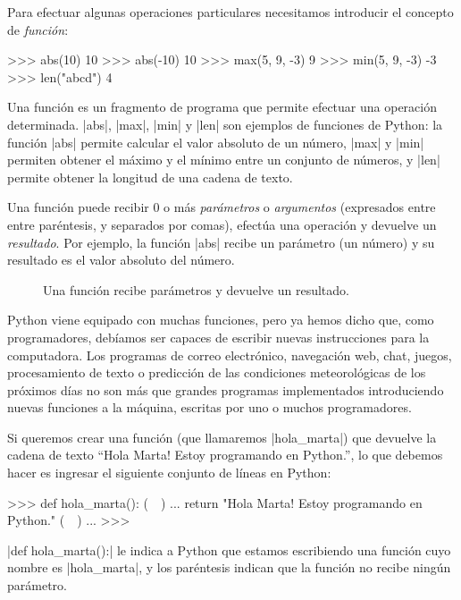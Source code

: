 Para efectuar algunas operaciones particulares necesitamos introducir el
concepto de \emph{función}:

\begin{codigo-python-sn}
>>> abs(10)
10
>>> abs(-10)
10
>>> max(5, 9, -3)
9
>>> min(5, 9, -3)
-3
>>> len("abcd")
4
\end{codigo-python-sn}

Una función es un fragmento de programa que permite efectuar una operación
determinada.  |abs|, |max|, |min| y |len| son ejemplos de funciones de Python:
la función |abs| permite calcular el valor absoluto de un número, |max| y |min|
permiten obtener el máximo y el mínimo entre un conjunto de números, y |len|
permite obtener la longitud de una cadena de texto.

Una función puede recibir 0 o más \emph{parámetros} o \emph{argumentos}
(expresados entre entre paréntesis, y separados por comas), efectúa una
operación y devuelve un \emph{resultado}.  Por ejemplo, la función |abs| recibe
un parámetro (un número) y su resultado es el valor absoluto del número.

\begin{figure}[ht]
\begin{center}

\end{center}
\caption{Una función recibe parámetros y devuelve un resultado.}
\end{figure}

Python viene equipado con muchas funciones, pero ya hemos dicho que, como
programadores, debíamos ser capaces de escribir nuevas instrucciones para la
computadora. Los programas de correo electrónico, navegación web,
chat, juegos, procesamiento de texto o predicción de las condiciones
meteorológicas de los próximos días no son más que grandes programas
implementados introduciendo nuevas funciones a la máquina, escritas por uno o
muchos programadores.

Si queremos crear una función (que llamaremos |hola_marta|) que devuelve la
cadena de texto \enquote{Hola Marta! Estoy programando en Python.}, lo que debemos
hacer es ingresar el siguiente conjunto de líneas en Python:

\begin{codigo-python-sn}
>>> def hola_marta(): (~~)
...     return "Hola Marta! Estoy programando en Python." (~~)
...
>>>
\end{codigo-python-sn}

 |def hola_marta():| le indica a Python que estamos escribiendo una función cuyo
nombre es |hola_marta|, y los paréntesis indican que la función no recibe ningún
parámetro.

